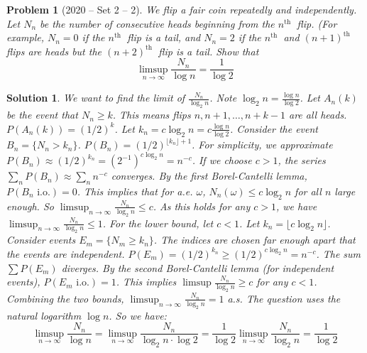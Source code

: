 \documentclass[12pt]{amsart}
\newtheorem{problem}{Problem}
\newtheorem*{solution}{Solution}
\begin{document}
\begin{problem}[2020 -- Set 2 -- 2]
We flip a fair coin repeatedly and independently. Let $N_n$ be the number of consecutive heads beginning from the $n^{\text {th }}$ flip. (For example, $N_n=0$ if the $n^{\text {th }}$ flip is a tail, and $N_n=2$ if the $n^{\text {th }}$ and $(n+1)^{\text {th }}$ flips are heads but the $(n+2)^{\text {th }}$ flip is a tail. Show that
$$
\limsup _{n \rightarrow \infty} \frac{N_n}{\log n}=\frac{1}{\log 2}
$$
\end{problem}
\begin{solution}
We want to find the limit of $\frac{N_n}{\log_2 n}$. Note $\log_2 n = \frac{\log n}{\log 2}$.
Let $A_n(k)$ be the event that $N_n \ge k$. This means flips $n, n+1, \ldots, n+k-1$ are all heads.
$P(A_n(k)) = (1/2)^k$.
Let $k_n = c \log_2 n = c \frac{\log n}{\log 2}$.
Consider the event $B_n = \{N_n > k_n\}$. $P(B_n) = (1/2)^{\lfloor k_n \rfloor+1}$. For simplicity, we approximate $P(B_n) \approx (1/2)^{k_n} = (2^{-1})^{c \log_2 n} = n^{-c}$.
If we choose $c>1$, the series $\sum_n P(B_n) \approx \sum_n n^{-c}$ converges. By the first Borel-Cantelli lemma, $P(B_n \text{ i.o.})=0$.
This implies that for a.e. $\omega$, $N_n(\omega) \le c\log_2 n$ for all $n$ large enough.
So $\limsup_{n\to\infty} \frac{N_n}{\log_2 n} \le c$. As this holds for any $c>1$, we have $\limsup_{n\to\infty} \frac{N_n}{\log_2 n} \le 1$.
For the lower bound, let $c<1$. Let $k_n = \lfloor c \log_2 n \rfloor$. Consider events $E_m = \{N_{m } \ge k_n\}$. The indices are chosen far enough apart that the events are independent.
$P(E_m) = (1/2)^{k_n} \ge (1/2)^{c\log_2 n} = n^{-c}$.
The sum $\sum P(E_m)$ diverges. By the second Borel-Cantelli lemma (for independent events), $P(E_m \text{ i.o.})=1$.
This implies $\limsup \frac{N_n}{\log_2 n} \ge c$ for any $c<1$.
Combining the two bounds, $\limsup_{n\to\infty} \frac{N_n}{\log_2 n} = 1$ a.s.
The question uses the natural logarithm $\log n$. So we have:
$$ \limsup_{n \rightarrow \infty} \frac{N_n}{\log n} = \limsup_{n \rightarrow \infty} \frac{N_n}{\log_2 n \cdot \log 2} = \frac{1}{\log 2} \limsup_{n \rightarrow \infty} \frac{N_n}{\log_2 n} = \frac{1}{\log 2} $$
\end{solution}
\end{document}

